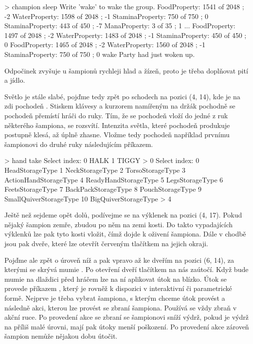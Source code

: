 \begin{code}
> champion sleep
Write 'wake' to wake the group.
FoodProperty: 1541 of 2048 ; -2
WaterProperty: 1598 of 2048 ; -1
StaminaProperty: 750 of 750 ; 0
StaminaProperty: 443 of 450 ; -7
ManaProperty: 3 of 35 ; 1
...
FoodProperty: 1497 of 2048 ; -2
WaterProperty: 1483 of 2048 ; -1
StaminaProperty: 450 of 450 ; 0
FoodProperty: 1465 of 2048 ; -2
WaterProperty: 1560 of 2048 ; -1
StaminaProperty: 750 of 750 ; 0
wake
Party had just woken up.
\end{code}

Odpočinek zvyšuje u šampionů rychleji hlad a žízeň, proto je třeba doplňovat pití a jídlo.



Světlo je stále slabé, pojďme tedy zpět po schodech na pozici (4, 14), kde je na zdi pochodeň . Stiskem klávesy 
 a kurzorem namířeným na držák pochodně se pochodeň přemístí hráči do ruky. Tím, že se pochodeň vloží 
do jedné z ruk některého šampiona, se rozsvítí. Intenzita světla, které pochodeň produkuje postupně klesá, až úplně zhasne.
Vložme tedy pochodeň například prvnímu šampionovi do druhé ruky následujícím
příkazem.

\begin{code}
> hand take
Select index:
0 HALK
1 TIGGY
> 0
Select index:
0 HeadStorageType
1 NeckStorageType
2 TorsoStorageType
3 ActionHandStorageType
4 ReadyHandStorageType
5 LegsStorageType
6 FeetsStorageType
7 BackPackStorageType
8 PouchStorageType
9 SmallQuiverStorageType
10 BigQuiverStorageType
> 4
\end{code}

Ještě než sejdeme opět dolů, podívejme se na výklenek  na pozici (4, 17). Pokud nějaký šampion zemře, zbudou po něm
na zemi kosti. Do takto vypadajících výklenků lze pak tyto kosti vložit,  čímž dojde k oživení šampiona.
Dále v chodbě jsou pak dveře, které lze otevřít červeným tlačítkem na jejich okraji.



Pojďme ale zpět o úroveň níž a pak vpravo až ke dveřím na pozici (6, 14), za kterými se skrývá mumie . 
Po otevření dveří tlačítkem na nás zaútočí. Když bude mumie na dlaždici před hráčem lze na ní aplikovat útok na blízko.
Útok se provede příkazem , který je rovněž k dispozici v interaktivní či parametrické formě. Nejprve
je třeba vybrat šampiona, s kterým chceme útok provést a následně akci, kterou lze provést se zbraní šampiona.
Používá se vždy zbraň v akční ruce. Po provedení akce se zbraní se šampionovi sníží výdrž, pokud je výdrž na příliš
malé úrovni, mají pak útoky menší poškození. Po provedení akce zároveň šampion nemůže nějakou dobu útočit.

